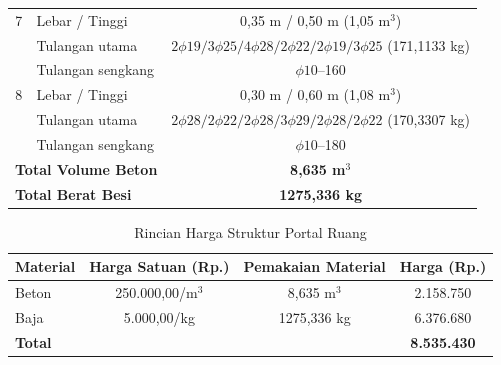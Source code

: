 \begin{longtable}{clcc}
7 & Lebar / Tinggi & \multicolumn{2}{c}{0,35 m / 0,50 m (1,05 m$^3$)} \\
  & Tulangan utama & \multicolumn{2}{c}{$2\phi19/3\phi25/4\phi28/2\phi22/2\phi19/3\phi25$ (171,1133 kg)} \\
  & Tulangan sengkang & \multicolumn{2}{c}{$\phi10$--160} \\
8 & Lebar / Tinggi & \multicolumn{2}{c}{0,30 m / 0,60 m (1,08 m$^3$)} \\
  & Tulangan utama & \multicolumn{2}{c}{$2\phi28/2\phi22/2\phi28/3\phi29/2\phi28/2\phi22$ (170,3307 kg)} \\
  & Tulangan sengkang & \multicolumn{2}{c}{$\phi10$--180} \\
\midrule
\multicolumn{2}{l}{\textbf{Total Volume Beton}} & \multicolumn{2}{c}{\textbf{8,635 m$^3$}} \\
\multicolumn{2}{l}{\textbf{Total Berat Besi}} & \multicolumn{2}{c}{\textbf{1275,336 kg}} \\
\end{longtable}
\endgroup

\begin{table}[htbp]
\centering
\caption{Rincian Harga Struktur Portal Ruang}
\label{tab:4-6}
\begin{tabular}{lccc}
\toprule
Material & Harga Satuan (Rp.) & Pemakaian Material & Harga (Rp.) \\
\midrule
Beton & 250.000,00/m$^3$ & 8,635 m$^3$   & 2.158.750 \\
Baja  & 5.000,00/kg      & 1275,336 kg   & 6.376.680 \\
\midrule
\textbf{Total} & & & \textbf{8.535.430} \\
\bottomrule
\end{tabular}
\end{table}
